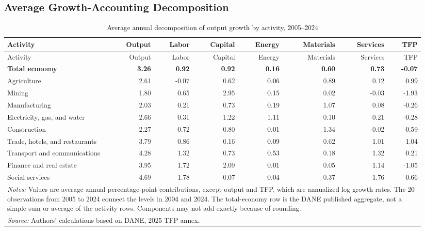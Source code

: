 \begin{landscape}
\section{Average Growth-Accounting Decomposition}

\begingroup
\small
\setlength{\tabcolsep}{4pt}
\begin{longtable}{p{4.4cm}rrrrrrr}
\caption{Average annual decomposition of output growth by activity, 2005--2024}
\label{tab:paper_growth_accounting}\\
\toprule
Activity & Output & Labor & Capital & Energy & Materials & Services & TFP \\
\midrule
\endfirsthead
\toprule
Activity & Output & Labor & Capital & Energy & Materials & Services & TFP \\
\midrule
\endhead
\textbf{Total economy} & \textbf{3.26} & \textbf{0.92} & \textbf{0.92} & \textbf{0.16} & \textbf{0.60} & \textbf{0.73} & \textbf{-0.07} \\
\midrule
Agriculture & 2.61 & -0.07 & 0.62 & 0.06 & 0.89 & 0.12 & 0.99 \\
Mining & 1.80 & 0.65 & 2.95 & 0.15 & 0.02 & -0.03 & -1.93 \\
Manufacturing & 2.03 & 0.21 & 0.73 & 0.19 & 1.07 & 0.08 & -0.26 \\
Electricity, gas, and water & 2.66 & 0.31 & 1.22 & 1.11 & 0.10 & 0.21 & -0.28 \\
Construction & 2.27 & 0.72 & 0.80 & 0.01 & 1.34 & -0.02 & -0.59 \\
Trade, hotels, and restaurants & 3.79 & 0.86 & 0.16 & 0.09 & 0.62 & 1.01 & 1.04 \\
Transport and communications & 4.28 & 1.32 & 0.73 & 0.53 & 0.18 & 1.32 & 0.21 \\
Finance and real estate & 3.95 & 1.72 & 2.09 & 0.01 & 0.05 & 1.14 & -1.05 \\
Social services & 4.69 & 1.78 & 0.07 & 0.04 & 0.37 & 1.76 & 0.66 \\
\bottomrule
\multicolumn{8}{p{15.9cm}}{\footnotesize \textit{Notes:} Values are average annual percentage-point contributions, except output and TFP, which are annualized log growth rates. The 20 observations from 2005 to 2024 connect the levels in 2004 and 2024. The total-economy row is the DANE published aggregate, not a simple sum or average of the activity rows. Components may not add exactly because of rounding.}\\
\multicolumn{8}{l}{\footnotesize \textit{Source:} Authors' calculations based on DANE, 2025 TFP annex.}\\
\end{longtable}
\endgroup
\end{landscape}
